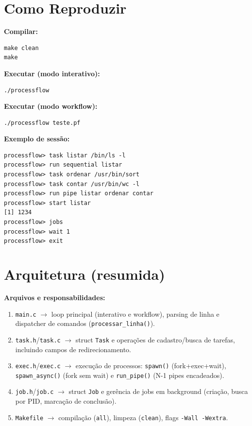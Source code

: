 \documentclass[11pt,a4paper]{article}
\begin{document}
\section{Como Reproduzir}

\textbf{Compilar:}
\begin{verbatim}
make clean
make
\end{verbatim}

\textbf{Executar (modo interativo):}
\begin{verbatim}
./processflow
\end{verbatim}

\textbf{Executar (modo workflow):}
\begin{verbatim}
./processflow teste.pf
\end{verbatim}

\textbf{Exemplo de sessão:}
\begin{verbatim}
processflow> task listar /bin/ls -l
processflow> run sequential listar
processflow> task ordenar /usr/bin/sort
processflow> task contar /usr/bin/wc -l
processflow> run pipe listar ordenar contar
processflow> start listar
[1] 1234
processflow> jobs
processflow> wait 1
processflow> exit
\end{verbatim}

\section{Arquitetura (resumida)}

\textbf{Arquivos e responsabilidades:}
\begin{enumerate}[itemsep=2pt]
  \item \texttt{main.c} $\to$ loop principal (interativo e workflow), parsing de linha e dispatcher de comandos (\texttt{processar\_linha()}).
  \item \texttt{task.h}/\texttt{task.c} $\to$ struct \texttt{Task} e operações de cadastro/busca de tarefas, incluindo campos de redirecionamento.
  \item \texttt{exec.h}/\texttt{exec.c} $\to$ execução de processos: \texttt{spawn()} (fork+exec+wait), \texttt{spawn\_async()} (fork sem wait) e \texttt{run\_pipe()} (N-1 pipes encadeados).
  \item \texttt{job.h}/\texttt{job.c} $\to$ struct \texttt{Job} e gerência de jobs em background (criação, busca por PID, marcação de conclusão).
  \item \texttt{Makefile} $\to$ compilação (\texttt{all}), limpeza (\texttt{clean}), flags \texttt{-Wall -Wextra}.
\end{enumerate}
\end{document}
